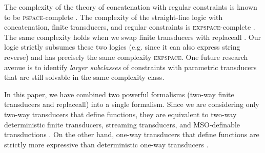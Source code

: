 The complexity of the theory of concatenation with regular constraints is
known to be \textsc{pspace}-complete \cite{Plandowski,J17}.
The complexity of the straight-line logic with concatenation, finite
transducers, and regular constraints is  \textsc{expspace}-complete \cite{LB16}. The same 
complexity holds when we swap finite transducers with replaceall 
\cite{CCHLW18}. Our logic %
strictly subsumes these two logics (e.g. since it can
also express string reverse) and has precisely the same complexity  \textsc{expspace}.
One future research avenue is to identify \emph{larger subclasses} of
constraints with parametric transducers that are still solvable in the same 
complexity class.
%

In this paper, we have combined two powerful formalisms 
(two-way finite transducers and replaceall) into a single formalism. Since we 
are considering
only two-way transducers that define functions, they are equivalent to 
two-way deterministic finite transducers, streaming transducers, and
MSO-definable transductions 
\cite{EH01,AC10,AD11}. On the other hand, one-way transducers that define 
functions are strictly more expressive than deterministic one-way transducers
\cite{Berstel}. 

